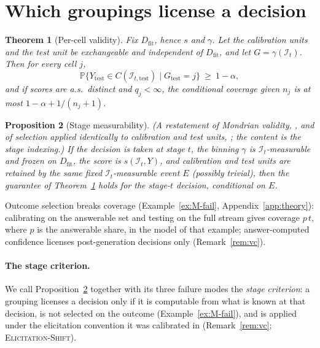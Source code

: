 \documentclass[twoside]{article}
\newtheorem{theorem}{Theorem}
\newtheorem{proposition}[theorem]{Proposition}
\theoremstyle{definition}
\theoremstyle{remark}
\newcommand{\Dfit}{D_{\mathrm{fit}}}
\newcommand{\Info}{\mathcal{I}}
\renewcommand{\P}{\mathbb{P}}
\newcommand{\1}{\mathbf{1}}
\newcommand{\expname}[1]{\textsc{#1}}
\begin{document}
\section{Which groupings license a decision}
\label{sec:validity}

\begin{theorem}[Per-cell validity]
\label{thm:A}
Fix $\Dfit$, hence $s$ and $\gamma$. Let the calibration units and the test unit be
exchangeable and independent of $\Dfit$, and let $G=\gamma(\Info_t)$. Then for every
cell $j$,
\[
  \P\{Y_{\mathrm{test}} \in C(\Info_{t,\mathrm{test}}) \mid G_{\mathrm{test}} = j\} \ \ge\ 1-\alpha,
\]
and if scores are a.s.\ distinct and $q_j<\infty$, the conditional coverage given $n_j$
is at most $1-\alpha + 1/(n_j+1)$.
\end{theorem}

\begin{proposition}[Stage measurability]
\label{prop:M-suff}
(A restatement of Mondrian validity, \citealp{vovk2012conditional}, and of selection
applied identically to calibration and test units, \citealp[Thm.~1]{bao2024selective}; the content
is the stage indexing.) If the decision is taken at stage $t$, the binning $\gamma$ is
$\Info_t$-measurable and frozen on $\Dfit$, the score is $s(\Info_t,Y)$, and calibration and
test units are retained by the same fixed $\Info_t$-measurable event $E$ (possibly trivial),
then the guarantee of Theorem~\ref{thm:A} holds for the stage-$t$ decision, conditional on $E$.
\end{proposition}

Outcome selection breaks coverage (Example~\ref{ex:M-fail}, Appendix~\ref{app:theory}): calibrating on the
answerable set and testing on the full stream gives coverage $p\,t$, where $p$ is the answerable share,
in the model of that example; answer-computed confidence licenses
post-generation decisions only (Remark~\ref{rem:vc}).

\paragraph{The stage criterion.} We call Proposition~\ref{prop:M-suff} together with its three
failure modes the \emph{stage criterion}: a grouping licenses a decision only if it is computable
from what is known at that decision, is not selected on the outcome (Example~\ref{ex:M-fail}),
and is applied under the elicitation convention it was calibrated in (Remark~\ref{rem:vc}; \expname{Elicitation-Shift}).
\end{document}
